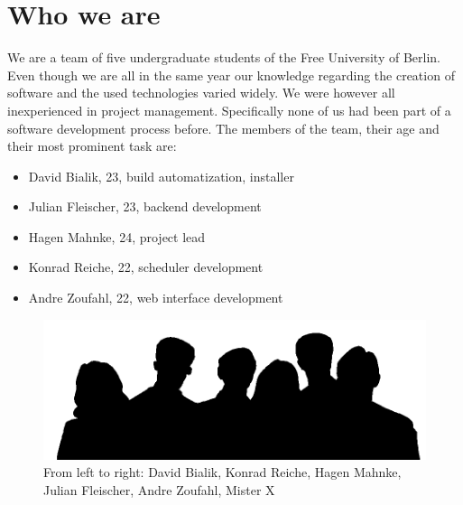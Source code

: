 
\section{Who we are}

We are a team of five undergraduate students of the Free University of Berlin. Even though  we are all in the same year our knowledge regarding the creation of software and the used technologies varied widely. We were however all inexperienced in project management. Specifically none of us had been part of a software development process before. The members of the team, their age and their most prominent task are:
\begin{itemize}
	\item David Bialik, 23, build automatization, installer
	\item Julian Fleischer, 23, backend development
	\item Hagen Mahnke, 24, project lead
	\item Konrad Reiche, 22, scheduler development
	\item Andre Zoufahl, 22, web interface development
\end{itemize}

\begin{figure}[H]
	\centering
		\includegraphics[width=\textwidth]{images/CROWD.png}
	\caption{\small From left to right: David Bialik, Konrad Reiche, Hagen Mahnke, Julian Fleischer, Andre Zoufahl, Mister X}
	\label{fig:us}
\end{figure}


